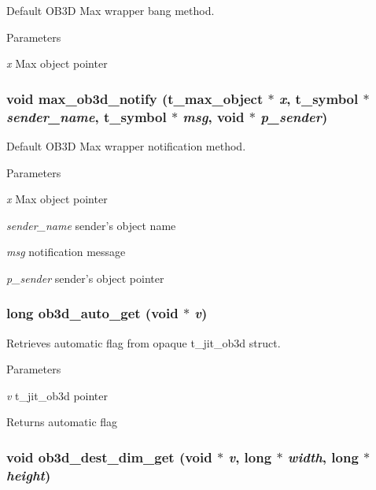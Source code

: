 Default OB3D Max wrapper bang method. 
\begin{DoxyParams}{Parameters}
\item[{\em x}]Max object pointer \end{DoxyParams}
\hypertarget{group__ob3dmod_ga2060791191cae96371aeae6090d1f215}{
\subsubsection[{max\_\-ob3d\_\-notify}]{\setlength{\rightskip}{0pt plus 5cm}void max\_\-ob3d\_\-notify ({\bf t\_\-max\_\-object} $\ast$ {\em x}, \/  {\bf t\_\-symbol} $\ast$ {\em sender\_\-name}, \/  {\bf t\_\-symbol} $\ast$ {\em msg}, \/  void $\ast$ {\em p\_\-sender})}}
\label{group__ob3dmod_ga2060791191cae96371aeae6090d1f215}


Default OB3D Max wrapper notification method. 
\begin{DoxyParams}{Parameters}
\item[{\em x}]Max object pointer \item[{\em sender\_\-name}]sender's object name \item[{\em msg}]notification message \item[{\em p\_\-sender}]sender's object pointer \end{DoxyParams}
\hypertarget{group__ob3dmod_ga4341a2f9266925591b847ba5499a6d16}{
\subsubsection[{ob3d\_\-auto\_\-get}]{\setlength{\rightskip}{0pt plus 5cm}long ob3d\_\-auto\_\-get (void $\ast$ {\em v})}}
\label{group__ob3dmod_ga4341a2f9266925591b847ba5499a6d16}


Retrieves automatic flag from opaque t\_\-jit\_\-ob3d struct. 
\begin{DoxyParams}{Parameters}
\item[{\em v}]t\_\-jit\_\-ob3d pointer\end{DoxyParams}
\begin{DoxyReturn}{Returns}
automatic flag 
\end{DoxyReturn}
\hypertarget{group__ob3dmod_gacfadba2dc254ad30556821c5a6102012}{
\subsubsection[{ob3d\_\-dest\_\-dim\_\-get}]{\setlength{\rightskip}{0pt plus 5cm}void ob3d\_\-dest\_\-dim\_\-get (void $\ast$ {\em v}, \/  long $\ast$ {\em width}, \/  long $\ast$ {\em height})}}
\label{group__ob3dmod_gacfadba2dc254ad30556821c5a6102012}


